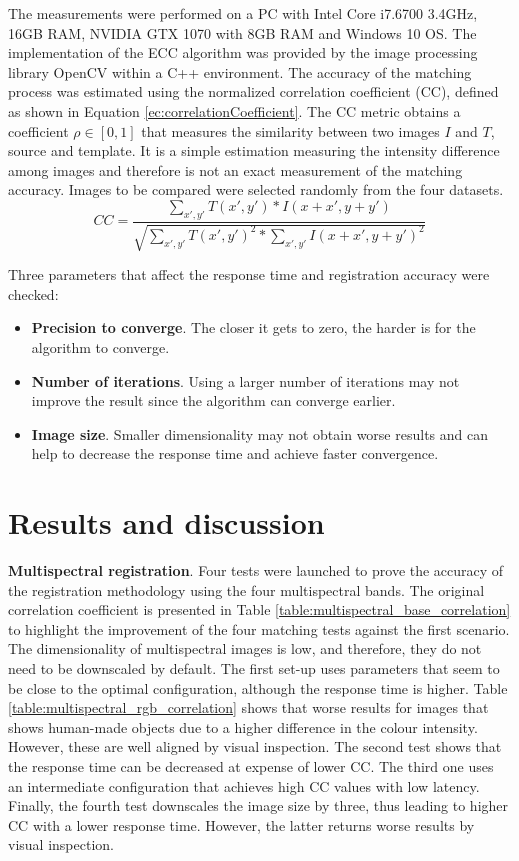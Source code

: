 The measurements were performed on a PC with Intel Core i7.6700 3.4GHz, 16GB RAM, NVIDIA GTX 1070 with 8GB RAM and Windows 10 OS. The implementation of the ECC algorithm was provided by the image processing library OpenCV within a C++ environment. The accuracy of the matching process was estimated using the normalized correlation coefficient (CC), defined as shown in Equation \ref{ec:correlationCoefficient}. The CC metric obtains a coefficient $\rho \in [0, 1]$ that measures the similarity between two images $I$ and $T$, source and template. It is a simple estimation measuring the intensity difference among images and therefore is not an exact measurement of the matching accuracy. Images to be compared were selected randomly from the four datasets.
\begin{equation}
    \label{ec:correlationCoefficient}
    \textit{CC} = \frac{\sum_{x',y'} T(x',y') * I(x + x', y + y')}{\sqrt{\sum_{x',y'}T(x',y')^{2} * \sum_{x',y'}I(x + x',y + y')^{2}}}
\end{equation}

Three parameters that affect the response time and registration accuracy were checked: 
\begin{itemize}
    \item \textbf{Precision to converge}. The closer it gets to zero, the harder is for the algorithm to converge.
    \item \textbf{Number of iterations}. Using a larger number of iterations may not improve the result since the algorithm can converge earlier.
    \item \textbf{Image size}. Smaller dimensionality may not obtain worse results and can help to decrease the response time and achieve faster convergence. 
\end{itemize}

\section{Results and discussion}
\label{sec:Results}

\textbf{Multispectral registration}. Four tests were launched to prove the accuracy of the registration methodology using the four multispectral bands. The original correlation coefficient is presented in Table \ref{table:multispectral_base_correlation} to highlight the improvement of the four matching tests against the first scenario. The dimensionality of multispectral images is low, and therefore, they do not need to be downscaled by default. The first set-up uses parameters that seem to be close to the optimal configuration, although the response time is higher. Table \ref{table:multispectral_rgb_correlation} shows that worse results for images that shows human-made objects due to a higher difference in the colour intensity. However, these are well aligned by visual inspection. The second test shows that the response time can be decreased at expense of lower CC. The third one uses an intermediate configuration that achieves high CC values with low latency. Finally, the fourth test downscales the image size by three, thus leading to higher CC with a lower response time. However, the latter returns worse results by visual inspection.

